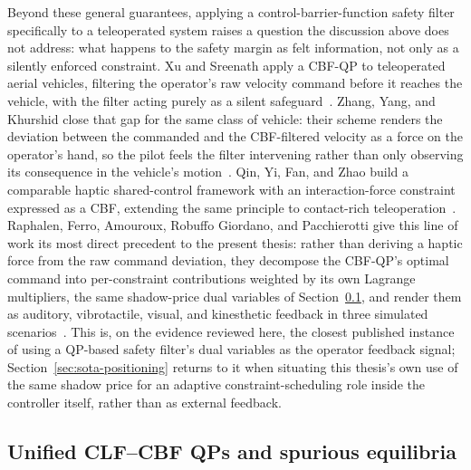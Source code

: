 \label{sec:sota-teleop-barriers}
\begin{sloppypar}
Beyond these general guarantees, applying a control-barrier-function safety filter specifically to a teleoperated system raises a question the discussion above does not address: what happens to the safety margin as felt information, not only as a silently enforced constraint. Xu and Sreenath apply a CBF-QP to teleoperated aerial vehicles, filtering the operator's raw velocity command before it reaches the vehicle, with the filter acting purely as a silent safeguard~\cite{xu2018safeteleoperation}. Zhang, Yang, and Khurshid close that gap for the same class of vehicle: their scheme renders the deviation between the commanded and the CBF-filtered velocity as a force on the operator's hand, so the pilot feels the filter intervening rather than only observing its consequence in the vehicle's motion~\cite{zhang2020hapticuav}. Qin, Yi, Fan, and Zhao build a comparable haptic shared-control framework with an interaction-force constraint expressed as a CBF, extending the same principle to contact-rich teleoperation~\cite{qin2025hapticcbf}. Raphalen, Ferro, Amouroux, Robuffo Giordano, and Pacchierotti give this line of work its most direct precedent to the present thesis: rather than deriving a haptic force from the raw command deviation, they decompose the CBF-QP's optimal command into per-constraint contributions weighted by its own Lagrange multipliers, the same shadow-price dual variables of Section~\ref{sec:sota-clf-cbf-qp}, and render them as auditory, vibrotactile, visual, and kinesthetic feedback in three simulated scenarios~\cite{raphalen2026feeling}. This is, on the evidence reviewed here, the closest published instance of using a QP-based safety filter's dual variables as the operator feedback signal; Section~\ref{sec:sota-positioning} returns to it when situating this thesis's own use of the same shadow price for an adaptive constraint-scheduling role inside the controller itself, rather than as external feedback.
\end{sloppypar}

\subsection{Unified CLF--CBF QPs and spurious equilibria}
\label{sec:sota-clf-cbf-qp}

